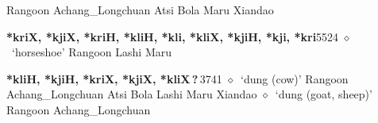 \begin{list}{}{\leftmargin=1.5em \itemindent=-1.5em}
         Rangoon 
\hspace{1ex}
         Achang\_Longchuan 
\hspace{1ex}
         Atsi 
\hspace{1ex}
         Bola 
\hspace{1ex}
         Maru 
\hspace{1ex}
         Xiandao 
  \item {\footnotesize \textbf{*kriX, *kjiX, *kriH, *kliH, *kli, *kliX, *kjiH, *kji, *kri}}{\tiny 5524}
\hspace{1ex}
         $\diamond$~`horseshoe'
         Rangoon 
\hspace{1ex}
         Lashi 
\hspace{1ex}
         Maru 
  \item {\footnotesize \textbf{*kliH, *kjiH, *kriX, *kjiX, *kliX\,?\,}}{\tiny 3741}
\hspace{1ex}
         $\diamond$~`dung (cow)'
         Rangoon 
\hspace{1ex}
         Achang\_Longchuan 
\hspace{1ex}
         Atsi 
\hspace{1ex}
         Bola 
\hspace{1ex}
         Lashi 
\hspace{1ex}
         Maru 
\hspace{1ex}
         Xiandao 
\hspace{1ex}
         $\diamond$~`dung (goat, sheep)'
         Rangoon 
\hspace{1ex}
         Achang\_Longchuan 
\hspace{1ex}

\end{list}
